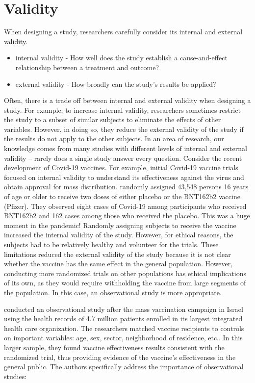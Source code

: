\documentclass[]{book}
\begin{document}
\hypertarget{validity}{%
\section{Validity}\label{validity}}

When designing a study, researchers carefully consider its internal and external validity.

\begin{itemize}
\item
  internal validity - How well does the study establish a cause-and-effect relationship between a treatment and outcome?
\item
  external validity - How broadly can the study's results be applied?
\end{itemize}

Often, there is a trade off between internal and external validity when designing a study. For example, to increase internal validity, researchers sometimes restrict the study to a subset of similar subjects to eliminate the effects of other variables. However, in doing so, they reduce the external validity of the study if the results do not apply to the other subjects. In an area of research, our knowledge comes from many studies with different levels of internal and external validity -- rarely does a single study answer every question. Consider the recent development of Covid-19 vaccines. For example, initial Covid-19 vaccine trials focused on internal validity to understand its effectiveness against the virus and obtain approval for mass distribution. \citet{polack2020safety} randomly assigned 43,548 persons 16 years of age or older to receive two doses of either placebo or the BNT162b2 vaccine (Pfizer). They observed eight cases of Covid-19 among participants who received BNT162b2 and 162 cases among those who received the placebo. This was a huge moment in the pandemic! Randomly assigning subjects to receive the vaccine increased the internal validity of the study. However, for ethical reasons, the subjects had to be relatively healthy and volunteer for the trials. These limitations reduced the external validity of the study because it is not clear whether the vaccine has the same effect in the general population. However, conducting more randomized trials on other populations has ethical implications of its own, as they would require withholding the vaccine from large segments of the population. In this case, an observational study is more appropriate.

\citet{dagan2021bnt162b2} conducted an observational study after the mass vaccination campaign in Israel using the health records of 4.7 million patients enrolled in its largest integrated health care organization. The researchers matched vaccine recipients to controls on important variables: age, sex, sector, neighborhood of residence, etc.. In this larger sample, they found vaccine effectiveness results consistent with the randomized trial, thus providing evidence of the vaccine's effectiveness in the general public. The authors specifically address the importance of observational studies:
\end{document}
